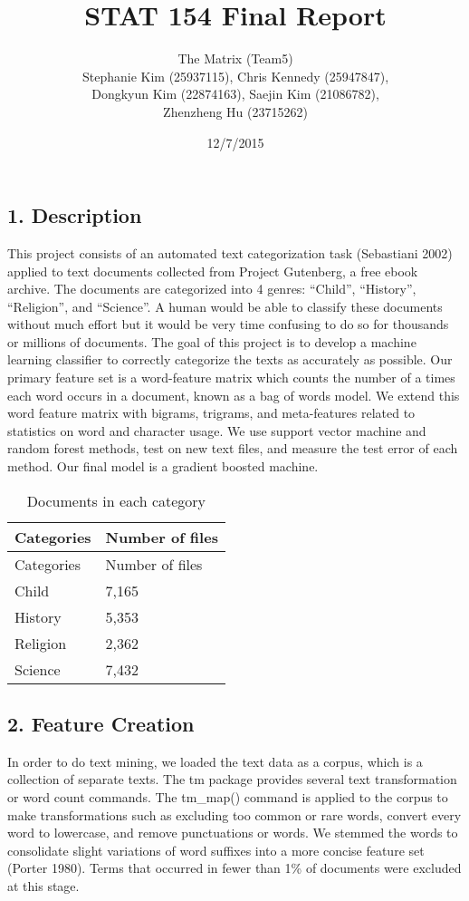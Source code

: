\documentclass[12pt,]{article}
\title{STAT 154 Final Report}
\author{The Matrix (Team5)\\Stephanie Kim (25937115), Chris Kennedy
(25947847),\\Dongkyun Kim (22874163), Saejin Kim (21086782),\\Zhenzheng
Hu (23715262)}
\date{12/7/2015}
\begin{document}
\maketitle


{
\hypersetup{linkcolor=black}
\setcounter{tocdepth}{2}
\tableofcontents
}
\subsection{1. Description}\label{description}

This project consists of an automated text categorization task
(Sebastiani 2002) applied to text documents collected from Project
Gutenberg, a free ebook archive. The documents are categorized into 4
genres: ``Child'', ``History'', ``Religion'', and ``Science''. A human
would be able to classify these documents without much effort but it
would be very time confusing to do so for thousands or millions of
documents. The goal of this project is to develop a machine learning
classifier to correctly categorize the texts as accurately as possible.
Our primary feature set is a word-feature matrix which counts the number
of a times each word occurs in a document, known as a bag of words
model. We extend this word feature matrix with bigrams, trigrams, and
meta-features related to statistics on word and character usage. We use
support vector machine and random forest methods, test on new text
files, and measure the test error of each method. Our final model is a
gradient boosted machine.

\begin{longtable}[c]{@{}ll@{}}
\caption{Documents in each category}\tabularnewline
\toprule
Categories & Number of files\tabularnewline
\midrule
\endfirsthead
\toprule
Categories & Number of files\tabularnewline
\midrule
\endhead
Child & 7,165\tabularnewline
History & 5,353\tabularnewline
Religion & 2,362\tabularnewline
Science & 7,432\tabularnewline
\bottomrule
\end{longtable}

\subsection{2. Feature Creation}\label{feature-creation}

In order to do text mining, we loaded the text data as a corpus, which
is a collection of separate texts. The tm package provides several text
transformation or word count commands. The tm\_map() command is applied
to the corpus to make transformations such as excluding too common or
rare words, convert every word to lowercase, and remove punctuations or
words. We stemmed the words to consolidate slight variations of word
suffixes into a more concise feature set (Porter 1980). Terms that
occurred in fewer than 1\% of documents were excluded at this stage.
\end{document}
